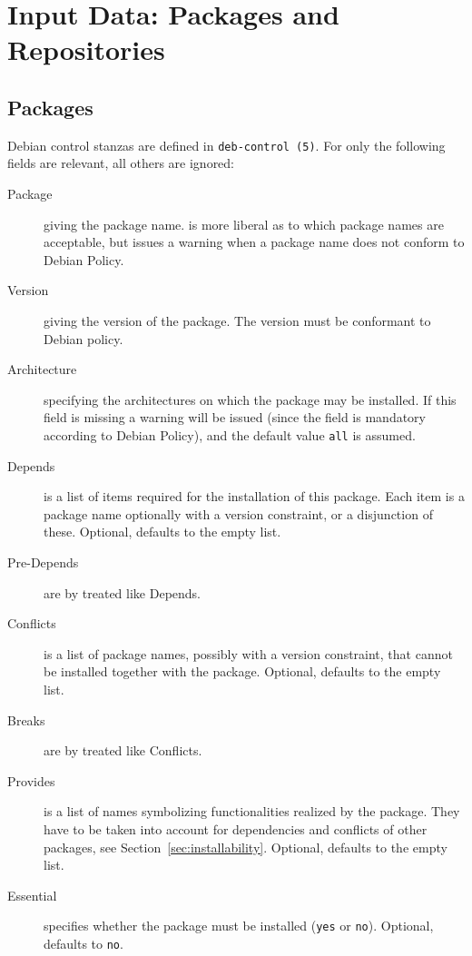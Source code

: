 
\section{Input Data: Packages and Repositories}
\label{sec:data}
\subsection{Packages}
\label{sec:packages}
Debian control stanzas are defined in \texttt{deb-control (5)}. For
\debcheck{} only the following fields are relevant, all others are
ignored:
\begin{description}
\item[Package] giving the package name. \debcheck{} is more liberal as
  to which package names are acceptable, but issues a warning when a
  package name does not conform to Debian Policy.
\item[Version] giving the version of the package. The version must be
  conformant to Debian policy.
\item[Architecture] specifying the architectures on which the package
  may be installed. If this field is missing a warning will be issued
  (since the field is mandatory according to Debian Policy), and the
  default value \texttt{all} is assumed.
\item[Depends] is a list of items required for the installation of
  this package. Each item is a package name optionally with a version
  constraint, or a disjunction of these. Optional, defaults to the
  empty list.
\item[Pre-Depends] are by \debcheck{} treated like Depends.
\item[Conflicts] is a list of package names, possibly with a version
  constraint, that cannot be installed together with the package. Optional,
  defaults to the empty list.
\item[Breaks] are by \debcheck{} treated like Conflicts.
\item[Provides] is a list of names symbolizing functionalities
  realized by the package. They have to be taken into account for
  dependencies and conflicts of other packages, see
  Section~\ref{sec:installability}. Optional, defaults to the empty
  list.
\item[Essential] specifies whether the package must be installed
  (\texttt{yes} or \texttt{no}). Optional, defaults to \texttt{no}.
\end{description}

